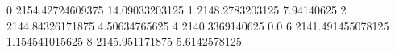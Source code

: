 0 2154.42724609375 14.09033203125
1 2148.2783203125 7.94140625
2 2144.84326171875 4.50634765625
4 2140.3369140625 0.0
6 2141.491455078125 1.154541015625
8 2145.951171875 5.6142578125
